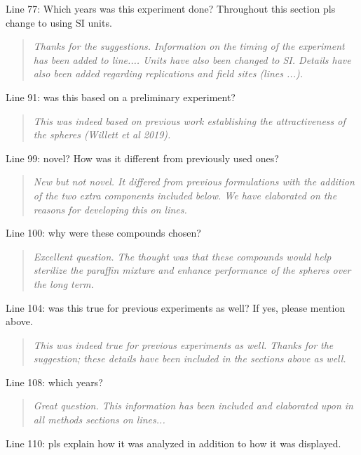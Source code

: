 \documentclass{article}
\begin{document}
Line 77: Which years was this experiment done? Throughout this section pls change to using SI units.

\begin{quote}
    \textit{Thanks for the suggestions.  Information on the timing of the experiment has been added to line.... Units have also been changed to SI.  Details have also been added regarding replications and field sites (lines ...).  }
\end{quote}

Line 91: was this based on a preliminary experiment?

\begin{quote}
    \textit{This was indeed based on previous work establishing the attractiveness of the spheres (Willett et al 2019). }
\end{quote}

Line 99: novel? How was it different from previously used ones?

\begin{quote}
    \textit{New but not novel.  It differed from previous formulations with the addition of the two extra components included below.  We have elaborated on the reasons for developing this on lines.   }
\end{quote}

Line 100: why were these compounds chosen?

\begin{quote}
    \textit{Excellent question.  The thought was that these compounds would help sterilize the paraffin mixture and enhance performance of the spheres over the long term.  }
\end{quote}

Line 104: was this true for previous experiments as well? If yes, please mention above.

\begin{quote}
    \textit{This was indeed true for previous experiments as well.  Thanks for the suggestion; these details have been included in the sections above as well.  }
\end{quote}

Line 108: which years?

\begin{quote}
    \textit{Great question.  This information has been included and elaborated upon in all methods sections on lines...}
\end{quote}

Line 110: pls explain how it was analyzed in addition to how it was displayed.
\end{document}
